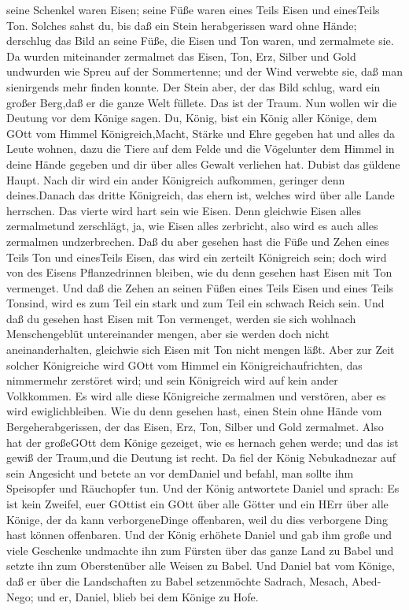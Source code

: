  seine Schenkel waren Eisen; seine Füße waren eines Teils
Eisen und einesTeils Ton.  Solches sahst du, bis daß ein
Stein herabgerissen ward ohne Hände; derschlug das Bild an seine Füße,
die Eisen und Ton waren, und zermalmete sie.  Da wurden
miteinander zermalmet das Eisen, Ton, Erz, Silber und Gold undwurden wie
Spreu auf der Sommertenne; und der Wind verwebte sie, daß man
sienirgends mehr finden konnte. Der Stein aber, der das Bild schlug,
ward ein großer Berg,daß er die ganze Welt füllete.  Das
ist der Traum. Nun wollen wir die Deutung vor dem Könige sagen.
 Du, König, bist ein König aller Könige, dem GOtt vom
Himmel Königreich,Macht, Stärke und Ehre gegeben hat  und
alles da Leute wohnen, dazu die Tiere auf dem Felde und die Vögelunter
dem Himmel in deine Hände gegeben und dir über alles Gewalt verliehen
hat. Dubist das güldene Haupt.  Nach dir wird ein ander
Königreich aufkommen, geringer denn deines.Danach das dritte Königreich,
das ehern ist, welches wird über alle Lande herrschen.  Das
vierte wird hart sein wie Eisen. Denn gleichwie Eisen alles zermalmetund
zerschlägt, ja, wie Eisen alles zerbricht, also wird es auch alles
zermalmen undzerbrechen.  Daß du aber gesehen hast die Füße
und Zehen eines Teils Ton und einesTeils Eisen, das wird ein zerteilt
Königreich sein; doch wird von des Eisens Pflanzedrinnen bleiben, wie du
denn gesehen hast Eisen mit Ton vermenget.  Und daß die
Zehen an seinen Füßen eines Teils Eisen und eines Teils Tonsind, wird es
zum Teil ein stark und zum Teil ein schwach Reich sein. 
Und daß du gesehen hast Eisen mit Ton vermenget, werden sie sich
wohlnach Menschengeblüt untereinander mengen, aber sie werden doch nicht
aneinanderhalten, gleichwie sich Eisen mit Ton nicht mengen läßt.
 Aber zur Zeit solcher Königreiche wird GOtt vom Himmel ein
Königreichaufrichten, das nimmermehr zerstöret wird; und sein Königreich
wird auf kein ander Volkkommen. Es wird alle diese Königreiche zermalmen
und verstören, aber es wird ewiglichbleiben.  Wie du denn
gesehen hast, einen Stein ohne Hände vom Bergeherabgerissen, der das
Eisen, Erz, Ton, Silber und Gold zermalmet. Also hat der großeGOtt dem
Könige gezeiget, wie es hernach gehen werde; und das ist gewiß der
Traum,und die Deutung ist recht.  Da fiel der König
Nebukadnezar auf sein Angesicht und betete an vor demDaniel und befahl,
man sollte ihm Speisopfer und Räuchopfer tun.  Und der
König antwortete Daniel und sprach: Es ist kein Zweifel, euer GOttist
ein GOtt über alle Götter und ein HErr über alle Könige, der da kann
verborgeneDinge offenbaren, weil du dies verborgene Ding hast können
offenbaren.  Und der König erhöhete Daniel und gab ihm
große und viele Geschenke undmachte ihn zum Fürsten über das ganze Land
zu Babel und setzte ihn zum Oberstenüber alle Weisen zu Babel.
 Und Daniel bat vom Könige, daß er über die Landschaften zu
Babel setzenmöchte Sadrach, Mesach, Abed-Nego; und er, Daniel, blieb bei
dem Könige zu Hofe.

